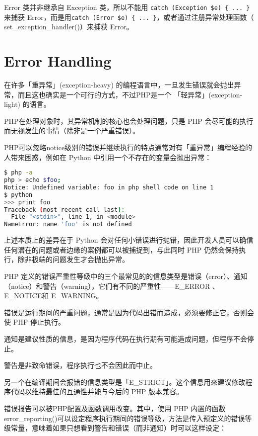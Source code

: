 Error 类并非继承自 Exception 类，所以不能用 \texttt{catch (Exception \$e) \{ ... \}} 来捕获 Error，而是用\texttt{catch (Error \$e) \{ ... \}}，或者通过注册异常处理函数（ set\_exception\_handler()）来捕获 Error。

\section{Error Handling}

在许多「重异常」(exception-heavy) 的编程语言中，一旦发生错误就会抛出异常，而且这也确实是一个可行的方式，不过PHP是一个 「轻异常」(exception-light) 的语言。

PHP在处理对象时，其异常机制的核心也会处理问题，只是 PHP 会尽可能的执行而无视发生的事情（除非是一个严重错误）。

PHP可以忽略notice级别的错误并继续执行的特点通常对有「重异常」编程经验的人带来困惑，例如在 Python 中引用一个不存在的变量会抛出异常：

\begin{lstlisting}[language=bash]
$ php -a
php > echo $foo;
Notice: Undefined variable: foo in php shell code on line 1
$ python
>>> print foo
Traceback (most recent call last):
  File "<stdin>", line 1, in <module>
NameError: name 'foo' is not defined
\end{lstlisting}

上述本质上的差异在于 Python 会对任何小错误进行抛错，因此开发人员可以确信任何潜在的问题或者边缘的案例都可以被捕捉到，与此同时 PHP 仍然会保持执行，除非极端的问题发生才会抛出异常。

PHP 定义的错误严重性等级中的三个最常见的的信息类型是错误（error）、通知（notice）和警告（warning），它们有不同的严重性——E\_ERROR 、E\_NOTICE和 E\_WARNING。

\begin{compactitem}
\item 错误是运行期间的严重问题，通常是因为代码出错而造成，必须要修正它，否则会使 PHP 停止执行。
\item 通知是建议性质的信息，是因为程序代码在执行期有可能造成问题，但程序不会停止。
\item 警告是非致命错误，程序执行也不会因此而中止。
\end{compactitem}

另一个在编译期间会报错的信息类型是「E\_STRICT」。这个信息用來建议修改程序代码以维持最佳的互通性并能与今后的 PHP 版本兼容。


错误报告可以被PHP配置及函数调用改变。其中，使用 PHP 内置的函数 error\_reporting()可以设定程序执行期间的错误等级，方法是传入预定义的错误等级常量，意味着如果只想看到警告和错误（而非通知）时可以这样设定：

